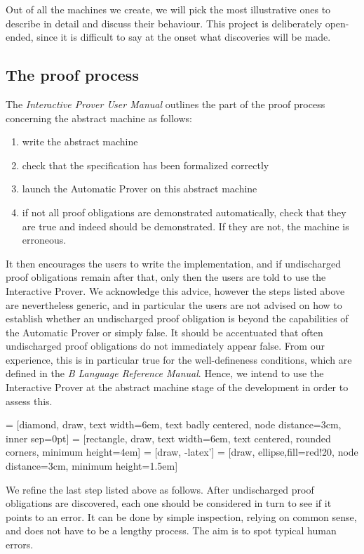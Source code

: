 \documentclass[12pt,journal,duplex]{IEEEtran}
\begin{document}
	Out of all the machines we create, we will pick the most illustrative ones to describe in detail and discuss their behaviour. This project is deliberately open-ended, since it is difficult to say at the onset what discoveries will be made.
	\subsection{The proof process}
	The \emph{Interactive Prover User Manual} outlines the part of the proof process concerning the abstract machine as follows:
	\begin{enumerate}
		\item write the abstract machine
		\item check that the specification has been formalized correctly
		\item launch the Automatic Prover on this abstract machine
		\item if not all proof obligations are demonstrated automatically, check that they are true and indeed should be demonstrated. If they are not, the machine is erroneous.
	\end{enumerate}

	It then encourages the users to write the implementation, and if undischarged proof obligations remain after that, only then the users are told to use the Interactive Prover. We acknowledge this advice, however the steps listed above are nevertheless generic, and in particular the users are not advised on how to establish whether an undischarged proof obligation is beyond the capabilities of the Automatic Prover or simply false. It should be accentuated that often undischarged proof obligations do not immediately appear false. From our experience, this is in particular true for the well-defineness conditions, which are defined in the \emph{B Language Reference Manual}. Hence, we intend to use the Interactive Prover at the abstract machine stage of the development in order to assess this.

	 = [diamond, draw,
	text width=6em, text badly centered, node distance=3cm, inner sep=0pt]
	 = [rectangle, draw,
	text width=6em, text centered, rounded corners, minimum height=4em]
	 = [draw, -latex']
	 = [draw, ellipse,fill=red!20, node distance=3cm,
	minimum height=1.5em]

	We refine the last step listed above as follows. After undischarged proof obligations are discovered, each one should be considered in turn to see if it points to an error. It can be done by simple inspection, relying on common sense, and does not have to be a lengthy process. The aim is to spot typical human errors.
\end{document}

